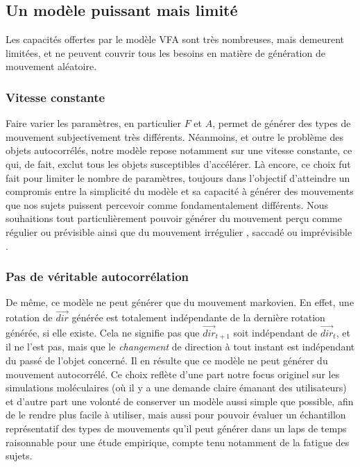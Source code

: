     \subsection{Un modèle puissant mais limité}
	Les capacités offertes par le modèle VFA sont très nombreuses, mais demeurent limitées, et ne peuvent couvrir tous les besoins en matière de génération de mouvement aléatoire.
    
    \subsubsection{Vitesse constante}
    Faire varier les paramètres, en particulier $F$ et $A$, permet de générer des types de mouvement subjectivement très différents. Néanmoins, et outre le problème des objets autocorrélés, notre modèle repose notamment sur une vitesse constante, ce qui, de fait, exclut tous les objets susceptibles d'accélérer. Là encore, ce choix fut fait pour limiter le nombre de paramètres, toujours dans l'objectif d'atteindre un compromis entre la simplicité du modèle et sa capacité à générer des mouvements que nos sujets puissent percevoir comme fondamentalement différents. Nous souhaitions tout particulièrement pouvoir générer du mouvement perçu comme \og régulier \fg{} ou \og prévisible \fg{} ainsi que du mouvement \og irrégulier \fg{}, \og saccadé \fg{} ou \og imprévisible \fg{}.
    
	\subsubsection{Pas de véritable autocorrélation}
	De même, ce modèle ne peut générer que du mouvement markovien. En effet, une rotation de $\vec{dir}$ générée est totalement indépendante de la dernière rotation générée, si elle existe. Cela ne signifie pas que $\vec{dir}_{t+1}$ soit indépendant de $\vec{dir}_{t}$, et il ne l'est pas, mais que le \emph{changement} de direction à tout instant est indépendant du passé de l'objet concerné. Il en résulte que ce modèle ne peut générer du mouvement autocorrélé. Ce choix reflète d'une part notre focus originel sur les simulations moléculaires (où il y a une demande claire émanant des utilisateurs) et d'autre part une volonté de conserver un modèle aussi simple que possible, afin de le rendre plus facile à utiliser, mais aussi pour pouvoir évaluer un échantillon représentatif des types de mouvements qu'il peut générer dans un laps de temps raisonnable pour une étude empirique, compte tenu notamment de la fatigue des sujets.
    
